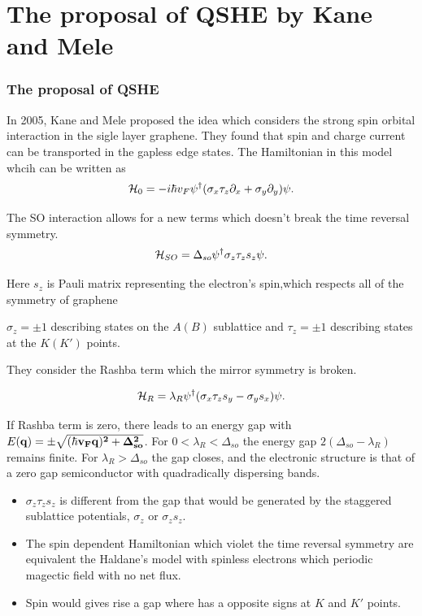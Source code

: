 \documentclass{beamer}
\begin{document}
\section{The proposal of QSHE by Kane and Mele}
\begin{frame}
  \frametitle{The proposal of QSHE}
In 2005, Kane and Mele proposed the idea which considers the strong spin 
orbital interaction in the sigle layer graphene. They found that spin and
charge current can be transported in the gapless edge states. The
Hamiltonian in this model whcih can be written as
\begin{equation*}
{\cal H}_0 = -i\hbar v_F \psi^\dagger(\sigma_x\tau_z\partial_x +
\sigma_y\partial_y)\psi.
\end{equation*}

The SO interaction allows for a new terms which doesn't break the time
reversal symmetry.
\begin{equation*}
{\cal H}_{SO} = \Delta_{so} \psi^\dagger \sigma_z\tau_z s_z \psi.
\end{equation*}

Here $s_z$ is Pauli matrix representing the electron's spin,which respects
all of the symmetry of graphene

$\sigma_z = \pm 1$ describing states on the $A(B)$ sublattice and
$\tau_z = \pm 1$ describing states at the $K(K')$ points. 
\end{frame}

\begin{frame}
They consider the Rashba term which the mirror symmetry is broken. 

\begin{equation*}
{\cal H}_R = \lambda_R \psi^\dagger (\sigma_x\tau_z s_y - \sigma_y
s_x)\psi.
\end{equation*}

If Rashba term is zero, there leads to an energy gap with $E(\bf
q) = \pm\sqrt{(\hbar v_F q)^2 + \Delta_{so}^2}$. For $0<\lambda_R<\Delta_{so}$ the energy gap $2(\Delta_{so}-\lambda_R)$
remains finite.  For $\lambda_R>\Delta_{so}$ the gap closes, and the
electronic structure is that of a zero gap semiconductor with
quadradically dispersing bands.


\end{frame}

\begin{frame}
\begin{itemize}
  \item $\sigma_z\tau_z s_z$ is different from the gap that
would be generated by the staggered sublattice potentials,
$\sigma_z$ or $\sigma_z s_z$.

\item The spin dependent Hamiltonian which violet the time reversal symmetry are
equivalent the Haldane's model with spinless electrons which periodic
magectic field with no net flux.

\item Spin would gives rise a gap where has a opposite signs at $K$ and $K'$
points.
\end{itemize}
\end{frame}
\end{document}
